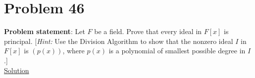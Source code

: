 \documentclass{article} %
\begin{document}
\section*{Problem 46}


\textbf{Problem statement}: Let $F$ be a field.  Prove that every ideal in $F[x]$ is principal. [\textit{Hint:} Use the Division Algorithm to show that the nonzero ideal $I$ in $F[x]$ is $(p(x))$, where $p(x)$ is a polynomial of smallest possible degree in $I$.]
\\

\underline{Solution}
\begin{addmargin}[1em]{0em}

\end{addmargin}

\newpage
\end{document}

